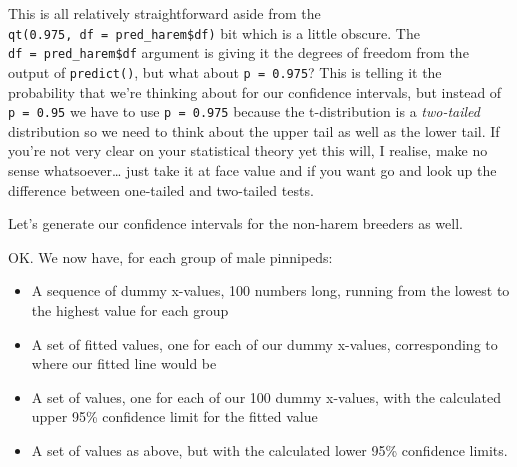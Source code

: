 \documentclass[
]{book}
\newenvironment{Shaded}{\begin{snugshade}}{\end{snugshade}}
\newcommand{\CommentTok}[1]{\textcolor[rgb]{0.56,0.35,0.01}{\textit{#1}}}
\newcommand{\DataTypeTok}[1]{\textcolor[rgb]{0.13,0.29,0.53}{#1}}
\newcommand{\FloatTok}[1]{\textcolor[rgb]{0.00,0.00,0.81}{#1}}
\newcommand{\KeywordTok}[1]{\textcolor[rgb]{0.13,0.29,0.53}{\textbf{#1}}}
\newcommand{\NormalTok}[1]{#1}
\newcommand{\OperatorTok}[1]{\textcolor[rgb]{0.81,0.36,0.00}{\textbf{#1}}}
\newcommand{\StringTok}[1]{\textcolor[rgb]{0.31,0.60,0.02}{#1}}
\providecommand{\tightlist}{%
  \setlength{\itemsep}{0pt}\setlength{\parskip}{0pt}}
\begin{document}
This is all relatively straightforward aside from the \texttt{qt(0.975,\ df\ =\ pred\_harem\$df)} bit which is a little obscure. The \texttt{df\ =\ pred\_harem\$df} argument is giving it the degrees of freedom from the output of \texttt{predict()}, but what about \texttt{p\ =\ 0.975}? This is telling it the probability that we're thinking about for our confidence intervals, but instead of \texttt{p\ =\ 0.95} we have to use \texttt{p\ =\ 0.975} because the t-distribution is a \emph{two-tailed} distribution so we need to think about the upper tail as well as the lower tail. If you're not very clear on your statistical theory yet this will, I realise, make no sense whatsoever\ldots{} just take it at face value and if you want go and look up the difference between one-tailed and two-tailed tests.

Let's generate our confidence intervals for the non-harem breeders as well.

\begin{Shaded}
\end{Shaded}

OK. We now have, for each group of male pinnipeds:

\begin{itemize}
\tightlist
\item
  A sequence of dummy x-values, 100 numbers long, running from the lowest to the highest value for each group
\item
  A set of fitted values, one for each of our dummy x-values, corresponding to where our fitted line would be
\item
  A set of values, one for each of our 100 dummy x-values, with the calculated upper 95\% confidence limit for the fitted value
\item
  A set of values as above, but with the calculated lower 95\% confidence limits.
\end{itemize}
\end{document}
